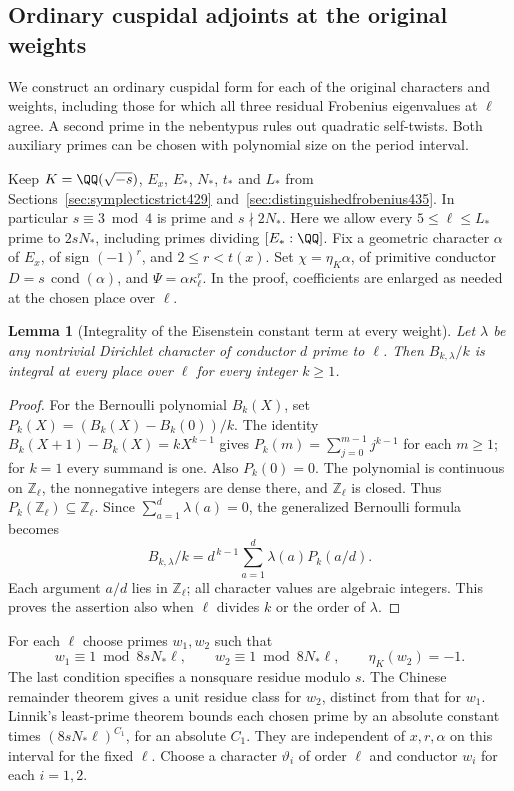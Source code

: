\documentclass[a4paper,11pt]{article}
\newtheorem{lemma}[proposition]{Lemma}
\theoremstyle{definition}
\theoremstyle{remark}
\newcommand{\ZZ}{\mathbb Z}\newcommand{\ord}{\operatorname{ord}}
\numberwithin{equation}{section}
\begin{document}
\subsection{Ordinary cuspidal adjoints at the original weights}
\label{sec:twoprimeadjoints436}

We construct an ordinary cuspidal form for each of the original
characters and weights, including those for which all three
residual Frobenius eigenvalues at \(\ell\) agree. A second
prime in the nebentypus rules out quadratic self-twists. Both
auxiliary primes can be chosen with polynomial size on the
period interval.

Keep \(K=\QQ(\sqrt{-s})\), \(E_x\), \(E_*\), \(N_*\), \(t_*\)
and \(L_*\) from Sections~\ref{sec:symplecticstrict429}
and~\ref{sec:distinguishedfrobenius435}. In particular
\(s\equiv3\bmod4\) is prime and \(s\nmid 2N_*\).
Here we allow every \(5\le\ell\le L_*\) prime to \(2sN_*\),
including primes dividing \([E_*:\QQ]\). Fix a geometric
character \(\alpha\) of \(E_x\), of sign \((-1)^r\), and
\(2\le r<t(x)\). Set \(\chi=\eta_K\alpha\), of primitive
conductor \(D=s\,\operatorname{cond}(\alpha)\), and
\(\Psi=\alpha\kappa_\ell^r\). In the proof, coefficients
are enlarged as needed at the chosen place over \(\ell\).

\begin{lemma}[Integrality of the Eisenstein constant term at every weight]\leavevmode
\label{lem:bernoulliall436}
Let \(\lambda\) be any nontrivial Dirichlet character of
conductor \(d\) prime to \(\ell\). Then \(B_{k,\lambda}/k\)
is integral at every place over \(\ell\) for every integer
\(k\ge1\).
\end{lemma}
\begin{proof}
For the Bernoulli polynomial \(B_k(X)\), set
\(P_k(X)=(B_k(X)-B_k(0))/k\). The identity
\(B_k(X+1)-B_k(X)=kX^{k-1}\) gives
\(P_k(m)=\sum_{j=0}^{m-1}j^{k-1}\) for each \(m\ge1\);
for \(k=1\) every summand is one. Also \(P_k(0)=0\).
The polynomial is continuous on \(\ZZ_\ell\), the nonnegative
integers are dense there, and \(\ZZ_\ell\) is closed.
Thus \(P_k(\ZZ_\ell)\subseteq\ZZ_\ell\). Since
\(\sum_{a=1}^d\lambda(a)=0\), the generalized Bernoulli
formula becomes
\[
       B_{k,\lambda}/k
           =d^{\,k-1}\sum_{a=1}^d\lambda(a)P_k(a/d).
\]
Each argument \(a/d\) lies in \(\ZZ_\ell\); all character
values are algebraic integers. This proves the assertion
also when \(\ell\) divides \(k\) or the order of \(\lambda\).
\end{proof}

For each \(\ell\) choose primes \(w_1,w_2\) such that
\[
  w_1\equiv1\bmod 8sN_*\ell,\qquad
  w_2\equiv1\bmod 8N_*\ell,\qquad \eta_K(w_2)=-1.
\]
The last condition specifies a nonsquare residue modulo \(s\).
The Chinese remainder theorem gives a unit residue class
for \(w_2\), distinct from that for \(w_1\). Linnik's
least-prime theorem bounds each chosen prime by an absolute
constant times \((8sN_*\ell)^{C_1}\), for an absolute \(C_1\).
They are independent of \(x,r,\alpha\) on this interval
for the fixed \(\ell\). Choose a character \(\vartheta_i\) of
order \(\ell\) and conductor \(w_i\) for each \(i=1,2\).
\end{document}
